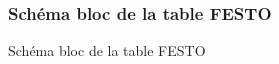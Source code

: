 \begin{figure}[hbtp]
\subsubsection{Schéma bloc de la table FESTO}
\caption{Schéma bloc de la table FESTO}
\centering
{}
\end{figure}

\vfill
\pagebreak


